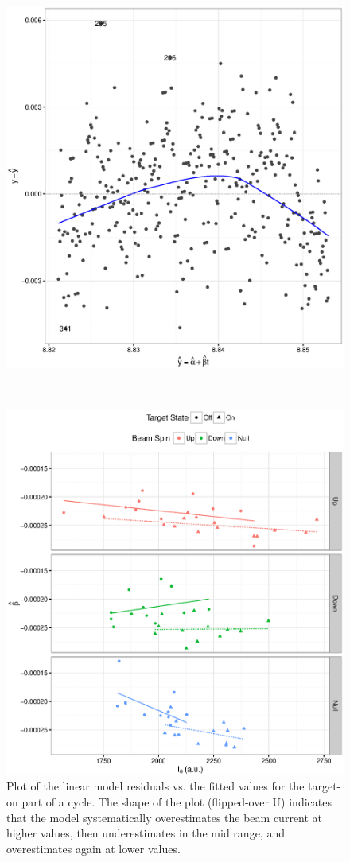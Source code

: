 \documentclass{article}
\begin{document}
\begin{figure}[h]
	\centering
	\begin{minipage}[t]{.5\textwidth}
		\centering
			\includegraphics[scale=.5]{Res_VS_Fit_2016-17.eps}
			\caption{Plot of the linear model residuals vs. the fitted values for the target-on part of a cycle. The shape of the plot (flipped-over U) indicates that the model systematically overestimates the beam current at higher values, then underestimates in the mid range, and overestimates again at lower values.\label{fig:RvF-u17}}
	\end{minipage}~~~~%
	\begin{minipage}[t]{.5\textwidth}
		\centering
			\includegraphics[scale=.5]{Slope_VS_IniCurrent_2016.eps}

\end{minipage}
\end{figure}
\end{document}
